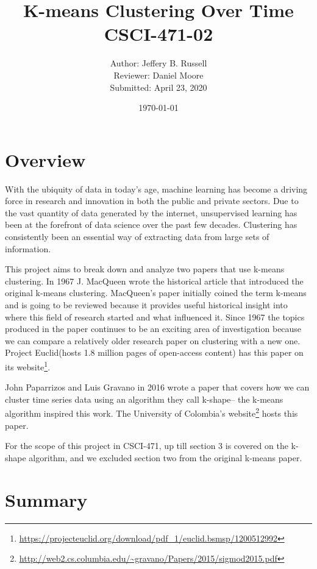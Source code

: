 \documentclass[12pt]{apa6}
\title{K-means Clustering Over Time\\CSCI-471-02}
\author{Author: Jeffery B. Russell\\ Reviewer: Daniel Moore\\Submitted: April 23, 2020}
\affiliation{%
 Computer Science at RIT\\
}%
\date{\today}
\begin{document}
\maketitle


\section{Overview}


With the ubiquity of data in today's age, machine learning has become a driving force in research and innovation in both the public and private sectors. Due to the vast quantity of data generated by the internet, unsupervised learning has been at the forefront of data science over the past few decades. Clustering has consistently been an essential way of extracting data from large sets of information.

This project aims to break down and analyze two papers that use k-means clustering. In 1967 J. MacQueen wrote the historical article that introduced \cite{k-means} the original k-means clustering. MacQueen's paper initially coined the term k-means\cite{k-means} and is going to be reviewed because it provides useful historical insight into where this field of research started and what influenced it. Since 1967 the topics produced in the paper continues to be an exciting area of investigation because we can compare a relatively older research paper on clustering with a new one. Project Euclid(hosts 1.8 million pages of open-access content) has this paper on its website\footnote{\url{https://projecteuclid.org/download/pdf_1/euclid.bsmsp/1200512992}}.

John Paparrizos and Luis Gravano in 2016 wrote a paper that covers how we can cluster time series data using an algorithm they call k-shape-- the k-means algorithm \cite{k-shape} inspired this work. The University of Colombia's website\footnote{\url{http://web2.cs.columbia.edu/~gravano/Papers/2015/sigmod2015.pdf}} hosts this paper.

For the scope of this project in CSCI-471, up till section 3 is covered on the k-shape algorithm, and we excluded section two from the original k-means paper. 

\section{Summary}

\end{document}
